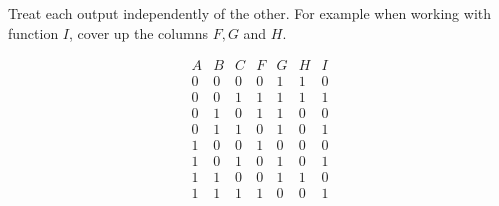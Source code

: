 \begin{enumerate}
\begin{enumerate}
	\begin{solution}{
	\begin{figure}[ht]
	\end{figure}
}\end{solution}
\end{enumerate}
Treat each output independently of the other.  For example when
working with function $I$, cover up the columns $F,G$ and $H$.

$$\begin{array}{c|c|c||c|c|c|c}
 	A & B & C & F & G & H & I \\ \hline
 	0 & 0 & 0 & 0 & 1 & 1 & 0 \\ \hline
 	0 & 0 & 1 & 1 & 1 & 1 & 1 \\ \hline
 	0 & 1 & 0 & 1 & 1 & 0 & 0 \\ \hline
 	0 & 1 & 1 & 0 & 1 & 0 & 1 \\ \hline
 	1 & 0 & 0 & 1 & 0 & 0 & 0 \\ \hline
 	1 & 0 & 1 & 0 & 1 & 0 & 1 \\ \hline
 	1 & 1 & 0 & 0 & 1 & 1 & 0 \\ \hline
 	1 & 1 & 1 & 1 & 0 & 0 & 1 \\
\end{array}$$


\end{enumerate}

